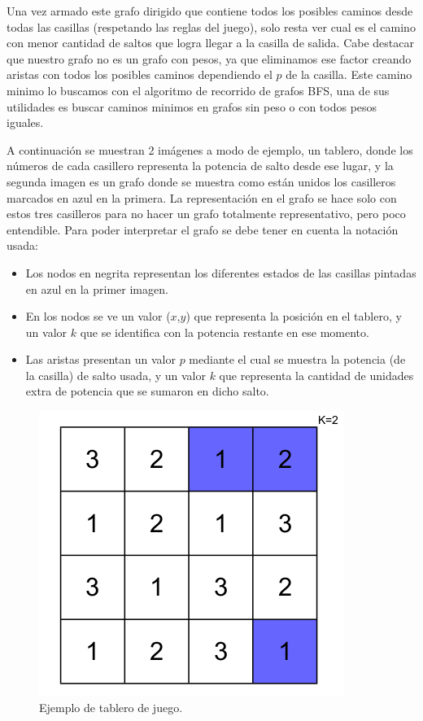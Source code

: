 Una vez armado este grafo dirigido que contiene todos los posibles caminos desde todas las casillas (respetando las reglas del juego), solo resta ver cual es el camino con menor cantidad de saltos que logra llegar a la casilla de salida. Cabe destacar que nuestro grafo no es un grafo con pesos, ya que eliminamos ese factor creando aristas con todos los posibles caminos dependiendo el $p$ de la casilla. Este camino minimo lo buscamos con el algoritmo de recorrido de grafos BFS, una de sus utilidades es buscar caminos minimos en grafos sin peso o con todos pesos iguales.


A continuaci\'on se muestran 2 im\'agenes a modo de ejemplo, un tablero, donde los n\'umeros de cada casillero representa la potencia de salto desde ese lugar, y la segunda imagen es un grafo donde se muestra como est\'an unidos los casilleros marcados en azul en la primera. La representaci\'on en el grafo se hace solo con estos tres casilleros para no hacer un grafo totalmente representativo, pero poco entendible.
Para poder interpretar el grafo se debe tener en cuenta la notaci\'on usada:
\begin{itemize}
\item Los nodos en negrita representan los diferentes estados de las casillas pintadas en azul en la primer imagen.
\item En los nodos se ve un valor ($x$,$y$) que representa la posici\'on en el tablero, y un valor $k$ que se identifica con la potencia restante en ese momento.
\item Las aristas presentan un valor $p$ mediante el cual se muestra la potencia (de la casilla) de salto usada, y un valor $k$ que representa la cantidad de unidades extra de potencia que se sumaron en dicho salto.
\end{itemize}

\begin{figure}[h]
\begin{center}
\includegraphics[scale=0.6]{./img/ej3_tablero.png}
\caption{Ejemplo de tablero de juego.}
\end{center}
\end{figure}

